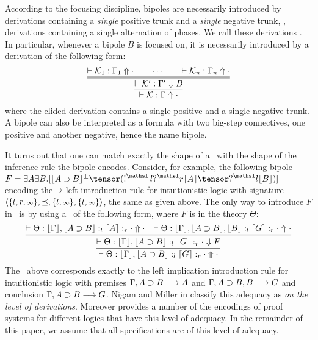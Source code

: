 According to the focusing discipline, bipoles are necessarily introduced by
derivations containing a \emph{single} positive trunk and a \emph{single}
negative trunk, \ie, derivations containing a single alternation of phases.
We call these derivations \emph{\bDers}.
In particular, whenever a bipole $B$ is focused on, it is necessarily
introduced by a derivation of the following form:
{\small
\[
\infer{\vdash \Kscr: \Gamma \Uparrow \cdot}{
 \infer={\vdash \Kscr' : \Gamma' \Downarrow B}
{
\vdash \Kscr_1 : \Gamma_1 \Uparrow \cdot
\qquad \cdots \qquad
\vdash \Kscr_n : \Gamma_n \Uparrow \cdot
}
}
\]
}
where the elided derivation contains a single
positive and a single negative trunk. A bipole can also be interpreted as a
formula with two big-step connectives, one positive and another negative,
hence the name bipole. 

It turns out that one can match exactly the shape
of a \bDer\ with the
shape of the inference rule the bipole
encodes.
Consider, for example, the
following bipole $F = \exists A \exists B.[\lft{A\iimp B}^\bot \tensor
(\nbang{l} \rghtQ{A}\tensor\lftQ{B})]$ encoding the $\supset$
left-introduction rule
for intuitionistic logic with signature $\langle\{l,r,
{\scriptstyle\infty}\},\preceq,\{l, {\scriptstyle\infty}\}, \{l, {\scriptstyle\infty}\}\rangle$, the same as given above.
The only way to introduce $F$ in \sellf\ is by using a \bDer\ of the
following form, where $F$  is in the theory $\Theta$:
{\small
\[
 \infer{\vdash \Theta : \lft{\Gamma}, \lft{A \iimp B} :_l \rght{G} :_r
\cdot
\Uparrow \cdot}{
\infer={\vdash \Theta : \lft{\Gamma}, \lft{A \iimp B} :_l \rght{G} :_r
\cdot
\Downarrow F}{
\vdash \Theta : \lft{\Gamma}, \lft{A \iimp B} :_l \rght{A} :_r \cdot
\Uparrow \cdot
&
\vdash \Theta : \lft{\Gamma}, \lft{A \iimp B}, \lft{B} :_l \rght{G} :_r
\cdot
\Uparrow \cdot
}}
\]
}
The \bDer\ above corresponds exactly to the left implication
introduction rule for intuitionistic logic with premises
$\Gamma, A\supset B \longrightarrow A$ and $\Gamma, A \supset B, B \longrightarrow G$ and conclusion
$\Gamma, A\supset B \longrightarrow G$. 
Nigam and Miller in \cite{nigam10jar} classify this adequacy as \emph{on
the level of derivations}. Moreover \cite{nigam10jar,nigam11lsfa} provides
a number of the encodings of proof systems for different logics that have
this level of
adequacy. In the remainder of this paper, we assume that all specifications
are of this level of adequacy.



